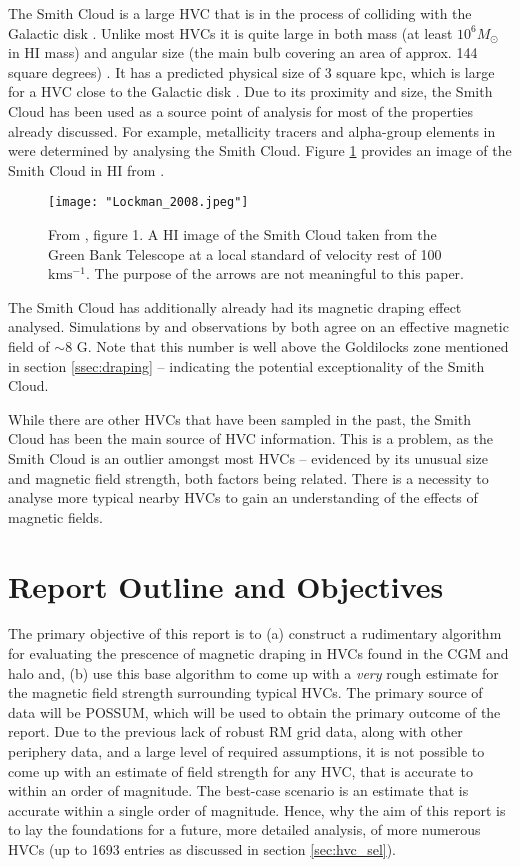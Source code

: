 The Smith Cloud is a large HVC that is in the process of colliding with the Galactic disk \citep{ID28, ID64, ID35}. Unlike most HVCs it is quite large in both mass (at least $10^6 M_{\odot}$ in HI mass) and angular size (the main bulb covering an area of approx. 144 square degrees) \citep{ID28, ID64, ID35}. It has a predicted physical size of 3 square kpc, which is large for a HVC close to the Galactic disk \citep{ID28}. Due to its proximity and size, the Smith Cloud has been used as a source point of analysis for most of the properties already discussed. For example, metallicity tracers and alpha-group elements in \cite{ID48, ID49} were determined by analysing the Smith Cloud. Figure \ref{fig:sc} provides an image of the Smith Cloud in HI from \cite{ID28}.

\begin{figure}
    \texttt{[image: "Lockman\_2008.jpeg"]}
    \centering
    \caption{From \cite{ID28}, figure 1. A HI image of the Smith Cloud taken from the Green Bank Telescope at a local standard of velocity rest of 100 $\mathrm{kms^{-1}}$. The purpose of the arrows are not meaningful to this paper.}
    \label{fig:sc}
\end{figure}


The Smith Cloud has additionally already had its magnetic draping effect analysed. Simulations by \cite{ID23} and observations by \cite{ID26} both agree on an effective magnetic field of $\sim$8 {\textmu}G. Note that this number is well above the Goldilocks zone mentioned in section \ref{ssec:draping} – indicating the potential exceptionality of the Smith Cloud.


While there are other HVCs that have been sampled in the past, the Smith Cloud has been the main source of HVC information. This is a problem, as the Smith Cloud is an outlier amongst most HVCs – evidenced by its unusual size and magnetic field strength, both factors being related. There is a necessity to analyse more typical nearby HVCs to gain an understanding of the effects of magnetic fields.

\section{Report Outline and Objectives}
\label{sec:outline}

The primary objective of this report is to (a) construct a rudimentary algorithm for evaluating the prescence of magnetic draping in HVCs found in the CGM and halo and, (b) use this base algorithm to come up with a \textit{very} rough estimate for the magnetic field strength surrounding typical HVCs. The primary source of data will be POSSUM, which will be used to obtain the primary outcome of the report. Due to the previous lack of robust RM grid data, along with other periphery data, and a large level of required assumptions, it is not possible to come up with an estimate of field strength for any HVC, that is accurate to within an order of magnitude. The best-case scenario is an estimate that is accurate within a single order of magnitude. Hence, why the aim of this report is to lay the foundations for a future, more detailed analysis, of more numerous HVCs (up to 1693 entries as discussed in section \ref{sec:hvc_sel}).


